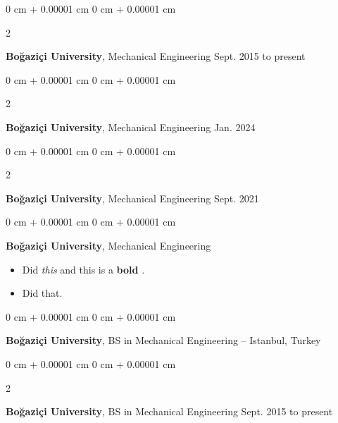 \documentclass[10pt, letterpaper]{article}
\newenvironment{highlights}{
    \begin{itemize}[
        topsep=0.10 cm,
        parsep=0.10 cm,
        partopsep=0pt,
        itemsep=0pt,
        leftmargin=0 cm + 10pt
    ]
}{
    \end{itemize}
} %
\newenvironment{onecolentry}{
    \begin{adjustwidth}{
        0 cm + 0.00001 cm
    }{
        0 cm + 0.00001 cm
    }
}{
    \end{adjustwidth}
} %
\newenvironment{twocolentry}[2][]{
    \onecolentry
    \def\secondColumn{#2}
    \setcolumnwidth{\fill, 4.2cm}
    \begin{paracol}{2}
}{
    \switchcolumn \raggedleft \secondColumn
    \end{paracol}
    \endonecolentry
} %
\let\hrefWithoutArrow\href
\renewcommand{\href}[2]{\hrefWithoutArrow{#1}{\mbox{\ifthenelse{\equal{#2}{}}{ }{#2 }\raisebox{.15ex}{\footnotesize \faExternalLink*}}}}
\begin{document}
        \vspace{0.1 cm}

        \begin{twocolentry}{
            Sept. 2015 to present
        }
            \textbf{Boğaziçi University}, Mechanical Engineering\end{twocolentry}


        \vspace{0.1 cm}

        \begin{twocolentry}{
            Jan. 2024
        }
            \textbf{Boğaziçi University}, Mechanical Engineering\end{twocolentry}


        \vspace{0.1 cm}

        \begin{twocolentry}{
            Sept. 2021
        }
            \textbf{Boğaziçi University}, Mechanical Engineering\end{twocolentry}


        \vspace{0.1 cm}

        \begin{onecolentry}
            \textbf{Boğaziçi University}, Mechanical Engineering    \begin{highlights}
                \item Did \textit{this} and this is a \textbf{bold} \href{https://example.com}{link}.
                \item Did that.
            \end{highlights}
        \end{onecolentry}


        \vspace{0.1 cm}

        \begin{onecolentry}
            \textbf{Boğaziçi University}, BS in Mechanical Engineering -- Istanbul, Turkey\end{onecolentry}


        \vspace{0.1 cm}

        \begin{twocolentry}{
            Sept. 2015 to present
        }
            \textbf{Boğaziçi University}, BS in Mechanical Engineering\end{twocolentry}


        \vspace{0.1 cm}
\end{document}
